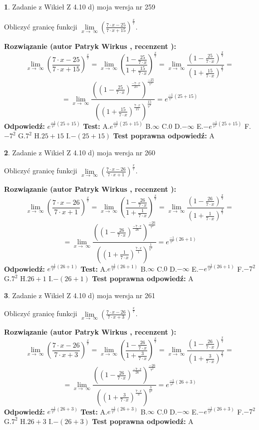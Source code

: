 \documentclass[12pt, a4paper]{article}
\theoremstyle{definition} %
\newtheorem{zad}{}
\newcommand{\zadStart}[1]{\begin{zad}#1\newline}
\newcommand{\zadStop}{\end{zad}}
\newcommand{\rozwStart}[2]{\noindent \textbf{Rozwiązanie (autor #1 , recenzent #2): }\newline}
\newcommand{\rozwStop}{\newline}
\newcommand{\odpStart}{\noindent \textbf{Odpowiedź:}\newline}
\newcommand{\odpStop}{\newline}
\newcommand{\testStart}{\noindent \textbf{Test:}\newline}
\newcommand{\testStop}{\newline}
\newcommand{\kluczStart}{\noindent \textbf{Test poprawna odpowiedź:}\newline}
\newcommand{\kluczStop}{\newline}
\begin{document}
\zadStart{Zadanie z Wikieł Z 4.10 d) moja wersja nr 259}


Obliczyć granicę funkcji  $\lim\limits_{x\to\ \infty}(\frac{7\cdot x-25}{7\cdot x+15})^{\frac{x}{7}}$.
\zadStop
\rozwStart{Patryk Wirkus}{}
$$\lim\limits_{x\to\ \infty}(\frac{7\cdot x-25}{7\cdot x+15})^{\frac{x}{7}} = \lim\limits_{x\to\ \infty}(\frac{1-\frac{25}{7\cdot x}}{1+\frac{15}{7\cdot x}})^{\frac{x}{7}}=\lim\limits_{x\to\ \infty}\frac{(1-\frac{25}{7\cdot x})^{\frac{x}{7}}}{(1+\frac{15}{7\cdot x})^{\frac{x}{7}}}=$$
$$=\lim\limits_{x\to\ \infty}\frac{((1-\frac{25}{7\cdot x})^{\frac{-7\cdot x}{25}})^{\frac{-25}{7^{2}}}}{((1+\frac{15}{7\cdot x})^{\frac{7\cdot x}{15}})^{\frac{15}{7^{2}}}}=e^{\frac{-1}{7^{2}}(25+15)}$$
\rozwStop
\odpStart
$e^{\frac{-1}{7^{2}}(25+15)}$
\odpStop
\testStart
A.$e^{\frac{-1}{7^{2}}(25+15)}$ B.$\infty$ C.$0$ D.$-\infty$ E.$-e^{\frac{-1}{7^{2}}(25+15)}$
F.$-7^{2}$ G.$7^{2}$
H.$25+15$
I.$-(25+15)$
\testStop
\kluczStart
A
\kluczStop



\zadStart{Zadanie z Wikieł Z 4.10 d) moja wersja nr 260}


Obliczyć granicę funkcji  $\lim\limits_{x\to\ \infty}(\frac{7\cdot x-26}{7\cdot x+1})^{\frac{x}{7}}$.
\zadStop
\rozwStart{Patryk Wirkus}{}
$$\lim\limits_{x\to\ \infty}(\frac{7\cdot x-26}{7\cdot x+1})^{\frac{x}{7}} = \lim\limits_{x\to\ \infty}(\frac{1-\frac{26}{7\cdot x}}{1+\frac{1}{7\cdot x}})^{\frac{x}{7}}=\lim\limits_{x\to\ \infty}\frac{(1-\frac{26}{7\cdot x})^{\frac{x}{7}}}{(1+\frac{1}{7\cdot x})^{\frac{x}{7}}}=$$
$$=\lim\limits_{x\to\ \infty}\frac{((1-\frac{26}{7\cdot x})^{\frac{-7\cdot x}{26}})^{\frac{-26}{7^{2}}}}{((1+\frac{1}{7\cdot x})^{\frac{7\cdot x}{1}})^{\frac{1}{7^{2}}}}=e^{\frac{-1}{7^{2}}(26+1)}$$
\rozwStop
\odpStart
$e^{\frac{-1}{7^{2}}(26+1)}$
\odpStop
\testStart
A.$e^{\frac{-1}{7^{2}}(26+1)}$ B.$\infty$ C.$0$ D.$-\infty$ E.$-e^{\frac{-1}{7^{2}}(26+1)}$
F.$-7^{2}$ G.$7^{2}$
H.$26+1$
I.$-(26+1)$
\testStop
\kluczStart
A
\kluczStop



\zadStart{Zadanie z Wikieł Z 4.10 d) moja wersja nr 261}


Obliczyć granicę funkcji  $\lim\limits_{x\to\ \infty}(\frac{7\cdot x-26}{7\cdot x+3})^{\frac{x}{7}}$.
\zadStop
\rozwStart{Patryk Wirkus}{}
$$\lim\limits_{x\to\ \infty}(\frac{7\cdot x-26}{7\cdot x+3})^{\frac{x}{7}} = \lim\limits_{x\to\ \infty}(\frac{1-\frac{26}{7\cdot x}}{1+\frac{3}{7\cdot x}})^{\frac{x}{7}}=\lim\limits_{x\to\ \infty}\frac{(1-\frac{26}{7\cdot x})^{\frac{x}{7}}}{(1+\frac{3}{7\cdot x})^{\frac{x}{7}}}=$$
$$=\lim\limits_{x\to\ \infty}\frac{((1-\frac{26}{7\cdot x})^{\frac{-7\cdot x}{26}})^{\frac{-26}{7^{2}}}}{((1+\frac{3}{7\cdot x})^{\frac{7\cdot x}{3}})^{\frac{3}{7^{2}}}}=e^{\frac{-1}{7^{2}}(26+3)}$$
\rozwStop
\odpStart
$e^{\frac{-1}{7^{2}}(26+3)}$
\odpStop
\testStart
A.$e^{\frac{-1}{7^{2}}(26+3)}$ B.$\infty$ C.$0$ D.$-\infty$ E.$-e^{\frac{-1}{7^{2}}(26+3)}$
F.$-7^{2}$ G.$7^{2}$
H.$26+3$
I.$-(26+3)$
\testStop
\kluczStart
A
\kluczStop
\end{document}
